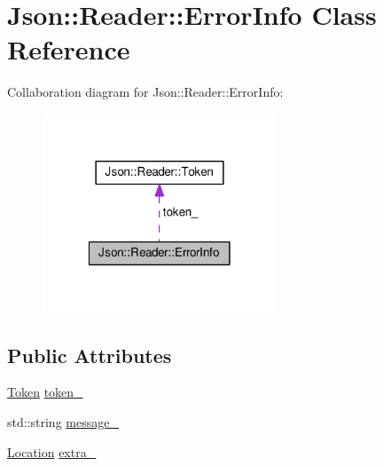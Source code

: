 \hypertarget{classJson_1_1Reader_1_1ErrorInfo}{\section{Json\-:\-:Reader\-:\-:Error\-Info Class Reference}
\label{db/d1f/classJson_1_1Reader_1_1ErrorInfo}
}


Collaboration diagram for Json\-:\-:Reader\-:\-:Error\-Info\-:
\nopagebreak
\begin{figure}[H]
\begin{center}
\leavevmode
\includegraphics[width=198pt]{d7/d45/classJson_1_1Reader_1_1ErrorInfo__coll__graph}
\end{center}
\end{figure}
\subsection*{Public Attributes}
\begin{DoxyCompactItemize}
\item 
\hyperlink{classJson_1_1Reader_1_1Token}{Token} \hyperlink{classJson_1_1Reader_1_1ErrorInfo_a52e1c71b12eb1c3f0395d7ef1e778ce6}{token\-\_\-}
\item 
std\-::string \hyperlink{classJson_1_1Reader_1_1ErrorInfo_aeb2fb6537a8bb978b239ea1482d73d7a}{message\-\_\-}
\item 
\hyperlink{classJson_1_1Reader_a46795b5b272bf79a7730e406cb96375a}{Location} \hyperlink{classJson_1_1Reader_1_1ErrorInfo_af92c24acf642b040d6e40aac4952d44d}{extra\-\_\-}
\end{DoxyCompactItemize}


